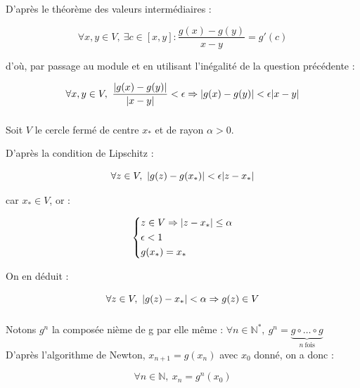 \documentclass{article}
\DeclarePairedDelimiter\abs{\lvert}{\rvert}%
\begin{document}
\subsubsection{}

D'après le théorème des valeurs intermédiaires : 

$$\forall x, y \in V, \ \exists c \in [x, y] : \frac{g(x) - g(y)}{x - y} = g'(c)$$

d'où, par passage au module et en utilisant l'inégalité de la question précédente :

$$\forall x, y \in V, \ \frac{\abs{g(x) - g(y)}}{\abs{x -y}} < \epsilon \Rightarrow \abs{g(x) - g(y)} < \epsilon \abs{x - y}$$

\subsubsection{}

Soit $V$ le cercle fermé de centre $x_*$ et de rayon $\alpha > 0$.

D'après la condition de Lipschitz :

$$\forall z \in V, \ \abs{g(z) - g(x_*)} < \epsilon \abs{z - x_*}$$

car $x_* \in V$, or :

\begin{equation*}
    \left \{
    \begin{aligned}
      & z \in V \Rightarrow \abs{z - x_*} \leq \alpha \\
      & \epsilon < 1 \\
      & g(x_*) = x_*
    \end{aligned} \right.
\end{equation*} 

On en déduit :

$$\forall z \in V, \ \abs{g(z) - x_*} < \alpha \Rightarrow g(z) \in V$$

\subsubsection{}

Notons $g^n$ la composée nième de g par elle même :
$\forall n \in \mathbb{N}^*, \ g^n= \underbrace{g \circ \ldots \circ g}_{n\ \text{fois}}$ \\

D'après l'algorithme de Newton, $x_{n + 1} = g(x_n)$ avec $x_0$ donné, on a donc : 

$$\forall n \in \mathbb{N}, \ x_n = g^n(x_0)$$ 
\end{document}
